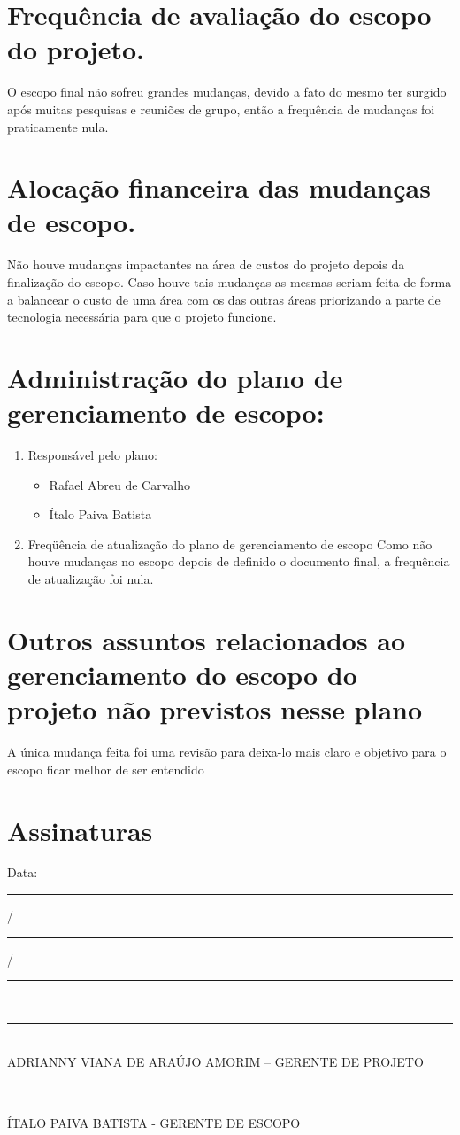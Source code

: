 \section{Frequência de avaliação do escopo do projeto.}
O escopo final não sofreu grandes mudanças, devido a fato do mesmo ter surgido após muitas pesquisas e reuniões de grupo, então a frequência de mudanças foi praticamente nula.

\section{Alocação financeira das mudanças de escopo.}
Não houve mudanças impactantes na área de custos do projeto depois da finalização do escopo. Caso houve tais mudanças as mesmas seriam feita de forma a balancear o custo de uma área com os das outras áreas priorizando a parte de tecnologia necessária para que o projeto funcione.

\section{Administração do plano de gerenciamento de escopo:}
\begin{enumerate}

\item Responsável pelo plano:
\begin{itemize}
\item Rafael Abreu de Carvalho
\item Ítalo Paiva Batista

\end{itemize}

\item Freqüência de atualização do plano de gerenciamento de escopo
Como não houve mudanças no escopo depois de definido o documento final, a frequência de atualização foi nula.
\end{enumerate}

\section{Outros assuntos relacionados ao gerenciamento do escopo do projeto não previstos nesse plano}
A única mudança feita foi uma revisão para deixa-lo mais claro e objetivo para o escopo ficar melhor de ser entendido

\section{Assinaturas}
\begin{center}
Data: \rule{0.5cm}{0.1mm}/\rule{0.5cm}{0.1mm}/\rule{1cm}{0.1mm}     \\
\rule{13cm}{0.1mm}\\
ADRIANNY VIANA DE ARAÚJO AMORIM – GERENTE DE PROJETO\\
\rule{13cm}{0.1mm}\\
ÍTALO PAIVA BATISTA - GERENTE DE ESCOPO

\end{center}
% 